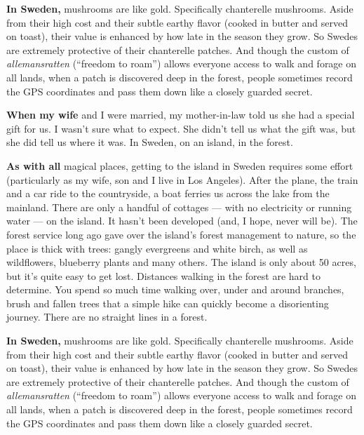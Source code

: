 \textbf{In Sweden,} mushrooms are like gold. Specifically chanterelle
mushrooms. Aside from their high cost and their subtle earthy flavor
(cooked in butter and served on toast), their value is enhanced by how
late in the season they grow. So Swedes are extremely protective of
their chanterelle patches. And though the custom of
\emph{allemansratten} (``freedom to roam'') allows everyone access to
walk and forage on all lands, when a patch is discovered deep in the
forest, people sometimes record the GPS coordinates and pass them down
like a closely guarded secret.

\textbf{When my wife} and I were married, my mother-in-law told us she
had a special gift for us. I wasn't sure what to expect. She didn't tell
us what the gift was, but she did tell us where it was. In Sweden, on an
island, in the forest.

\textbf{As with all} magical places, getting to the island in Sweden
requires some effort (particularly as my wife, son and I live in Los
Angeles). After the plane, the train and a car ride to the countryside,
a boat ferries us across the lake from the mainland. There are only a
handful of cottages --- with no electricity or running water --- on the
island. It hasn't been developed (and, I hope, never will be). The
forest service long ago gave over the island's forest management to
nature, so the place is thick with trees: gangly evergreens and white
birch, as well as wildflowers, blueberry plants and many others. The
island is only about 50 acres, but it's quite easy to get lost.
Distances walking in the forest are hard to determine. You spend so much
time walking over, under and around branches, brush and fallen trees
that a simple hike can quickly become a disorienting journey. There are
no straight lines in a forest.

\textbf{In Sweden,} mushrooms are like gold. Specifically chanterelle
mushrooms. Aside from their high cost and their subtle earthy flavor
(cooked in butter and served on toast), their value is enhanced by how
late in the season they grow. So Swedes are extremely protective of
their chanterelle patches. And though the custom of
\emph{allemansratten} (``freedom to roam'') allows everyone access to
walk and forage on all lands, when a patch is discovered deep in the
forest, people sometimes record the GPS coordinates and pass them down
like a closely guarded secret.

